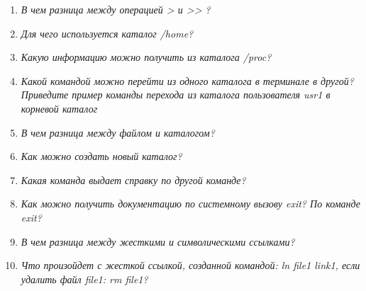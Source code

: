 \begin{enumerate}
	\item \textit{В чем разница между операцией > и >> ? }\newline 
	\item \textit{Для чего используется каталог /home?}\newline 
	\item \textit{Какую информацию можно получить из каталога /proc?}\newline 
	\item \textit{Какой командой можно перейти из одного каталога в терминале в другой? Приведите пример команды перехода из каталога пользователя usr1 в корневой каталог}\newline 
	\item \textit{В чем разница между файлом и каталогом?}\newline 
	\item \textit{Как можно создать новый каталог?}\newline 
	\item \textit{Какая команда выдает справку по другой команде? }\newline 
	\item \textit{Как можно получить документацию по системному вызову exit? По команде exit?}\newline 
	\item \textit{В чем разница между жесткими и символическими ссылками?}\newline 
	\item \textit{Что произойдет с жесткой ссылкой, созданной командой: ln file1 link1, если удалить файл file1: rm file1?}\newline 
\end{enumerate}

